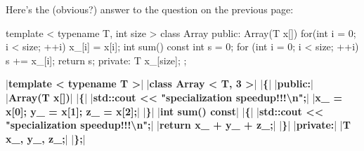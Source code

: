 Here's the (obvious?) answer to the question on the previous page:

\begin{consolethree}[escapeinside=||]
template < typename T, int size >
class Array
{
public:
     Array(T x[])
     {    
          for(int i = 0; i  < size; ++i)
          x_[i] = x[i];
     }
     int sum() const
     {    
          int s = 0;
          for (int i = 0; i  < size; ++i)
              s += x_[i];
          return s;
     }
private:
     T x_[size];
};

|\textbf{template < typename T >}|
|\textbf{class Array < T, 3 >}|           
|\textbf{\{}|
|\textbf{public:}|
     |\textbf{Array(T x[])}|
     |\textbf{\{}|
          |\textbf{std::cout << "specialization speedup!!!\textbackslash n";}|
          |\textbf{x\_ = x[0]; y\_ = x[1]; z\_ = x[2];}|
     |\textbf{\}}|
     |\textbf{int sum() const}|
     |\textbf{\{}|
          |\textbf{std::cout << "specialization speedup!!!\textbackslash n";}|
          |\textbf{return x\_ + y\_ + z\_;}|
     |\textbf{\}}|
|\textbf{private:}|
     |\textbf{T x\_, y\_, z\_;}|
|\textbf{\};}|           
\end{consolethree}
